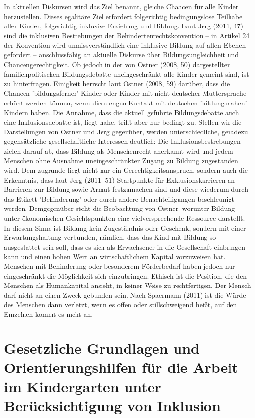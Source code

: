 In aktuellen Diskursen wird das Ziel benannt, gleiche Chancen für alle Kinder herzustellen. Dieses egalitäre Ziel erfordert folgerichtig bedingungslose Teilhabe aller Kinder, folgerichtig inklusive Erziehung und Bildung. Laut Jerg (2011, 47) sind die inklusiven Bestrebungen der Behindertenrechtskonvention – in Artikel 24 der Konvention wird unmissverständlich eine inklusive Bildung auf allen Ebenen gefordert – anschlussfähig an aktuelle Diskurse über Bildungsungleichheit und Chancengerechtigkeit. Ob jedoch in der von Ostner (2008, 50) dargestellten familienpolitischen Bildungsdebatte uneingeschränkt alle Kinder gemeint sind, ist zu hinterfragen. Einigkeit herrscht laut Ostner (2008, 59) darüber, dass die Chancen 'bildungsferner' Kinder oder Kinder mit nicht-deutscher Muttersprache erhöht werden können, wenn diese engen Kontakt mit deutschen 'bildungsnahen' Kindern haben. Die Annahme, dass die aktuell geführte Bildungsdebatte auch eine Inklusionsdebatte ist, liegt nahe, trifft aber nur bedingt zu. Stellen wir die Darstellungen von Ostner und Jerg gegenüber, werden unterschiedliche, geradezu gegensätzliche gesellschaftliche Interessen deutlich: Die Inklusionsbestrebungen zielen darauf ab, dass Bildung als Menschenrecht anerkannt wird und jedem Menschen ohne Ausnahme uneingeschränkter Zugang zu Bildung zugestanden wird. Dem zugrunde liegt nicht nur ein Gerechtigkeitsanspruch, sondern auch die Erkenntnis, dass laut Jerg (2011, 51) Startpunkte für Exklusionskarrieren an Barrieren zur Bildung sowie Armut festzumachen sind und diese wiederum durch das Etikett 'Behinderung' oder durch andere Benachteiligungen beschleunigt werden. Demgegenüber steht die Beobachtung von Ostner, worunter Bildung unter ökonomischen Gesichtspunkten eine vielversprechende Ressource darstellt. In diesem Sinne ist Bildung kein Zugeständnis oder Geschenk, sondern mit einer Erwartungshaltung verbunden, nämlich, dass das Kind mit Bildung so ausgestattet sein soll, dass es sich als Erwachsener in die Gesellschaft einbringen kann und einen hohen Wert an wirtschaftlichem Kapital vorzuweisen hat. Menschen mit Behinderung oder besonderem Förderbedarf haben jedoch nur eingeschränkt die Möglichkeit sich einzubringen. 
Ethisch ist die Position, die den Menschen als Humankapital ansieht, in keiner Weise zu rechtfertigen. Der Mensch darf nicht an einen Zweck gebunden sein. Nach Spaermann (2011) ist die Würde des Menschen dann verletzt, wenn es offen oder stillschweigend heißt, auf den Einzelnen kommt es nicht an. 

\section{Gesetzliche Grundlagen und Orientierungshilfen für die Arbeit im Kindergarten unter Berücksichtigung von Inklusion}

